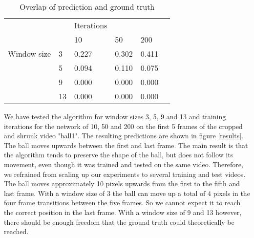 \documentclass{article}
\begin{document}
\begin{table}[b]
  \caption{Overlap of prediction and ground truth}
  \label{overlap}
  \centering
  \begin{tabular}{llllll}
    \toprule
			    & &Iterations &&\\
                &    & 10    & 50    & 200 \\
    \midrule
    Window size & 3  & 0.227 & 0.302 & 0.411 \\
                & 5  & 0.094 & 0.110 & 0.075 \\
                & 9  & 0.000 & 0.000 & 0.000 \\
                & 13 & 0.000 & 0.000 & 0.000 \\
     \bottomrule
  \end{tabular}
\end{table}

We have tested the algorithm for window sizes 3, 5, 9 and 13 and training iterations for the network of 10, 50 and 200 on the first 5 frames of the cropped and shrunk video "ball1". The resulting predictions are shown in figure \ref{results}. The ball moves upwards between the first and last frame. The main result is that the algorithm tends to preserve the shape of the ball, but does not follow its movement, even though it was trained and tested on the same video. Therefore, we refrained from scaling up our experiments to several training and test videos.\\

The ball moves approximately 10 pixels upwards from the first to the fifth and last frame. With a window size of 3 the ball can move up a total of 4 pixels in the four frame transitions between the five frames. So we cannot expect it to reach the correct position in the last frame. With a window size of 9 and 13 however, there should be enough freedom that the ground truth could theoretically be reached. \\
\end{document}

